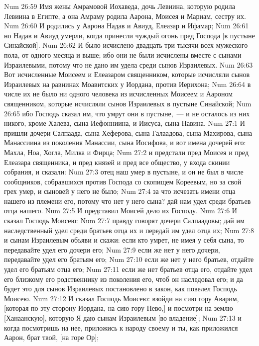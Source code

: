 \vs Num 26:59 Имя жены Амрамовой Иохаведа, дочь Левиина, которую родила  Левиина в Египте, а она Амраму родила Аарона, Моисея и Мариам, сестру их.
\vs Num 26:60 И родились у Аарона Надав и Авиуд, Елеазар и Ифамар;
\vs Num 26:61 но Надав и Авиуд умерли, когда принесли чуждый огонь пред Господа [в пустыне Синайской].
\vs Num 26:62 И было исчислено двадцать три тысячи всех мужеского пола, от одного месяца и выше; ибо они не были исчислены вместе с сынами Израилевыми, потому что не дано им удела среди сынов Израилевых.
\rsbpar\vs Num 26:63 Вот исчисленные Моисеем и Елеазаром священником, которые исчисляли сынов Израилевых на равнинах Моавитских у Иордана, против Иерихона;
\vs Num 26:64 в числе их не было ни одного человека из исчисленных Моисеем и Аароном священником, которые исчисляли сынов Израилевых в пустыне Синайской;
\vs Num 26:65 ибо Господь сказал им, что умрут они в пустыне,~--- и не осталось из них никого, кроме Халева, сына Иефонниина, и Иисуса, сына Навина.
\vs Num 27:1 И пришли дочери Салпаада, сына Хеферова, сына Галаадова, сына Махирова, сына Манассиина из поколения Манассии, сына Иосифова, и вот имена дочерей его: Махла, Ноа, Хогла, Милка и Фирца;
\vs Num 27:2 и предстали пред Моисея и пред Елеазара священника, и пред князей и пред все общество, у входа скинии собрания, и сказали:
\vs Num 27:3 отец наш умер в пустыне, и он не был в числе сообщников, собравшихся против Господа со скопищем Кореевым, но за свой грех умер, и сыновей у него не было;
\vs Num 27:4 за что исчезать имени отца нашего из племени его, потому что нет у него сына? дай нам удел среди братьев отца нашего.
\vs Num 27:5 И представил Моисей дело их Господу.
\rsbpar\vs Num 27:6 И сказал Господь Моисею:
\vs Num 27:7 правду говорят дочери Салпаадовы; дай им наследственный удел среди братьев отца их и передай им удел отца их;
\vs Num 27:8 и сынам Израилевым объяви и скажи: если кто умрет, не имея у себя сына, то передавайте удел его дочери его;
\vs Num 27:9 если же нет у него дочери, передавайте удел его братьям его;
\vs Num 27:10 если же нет у него братьев, отдайте удел его братьям отца его;
\vs Num 27:11 если же нет братьев отца его, отдайте удел его близкому его родственнику из поколения его, чтоб он наследовал его; и да будет это для сынов Израилевых постановлено в закон, как повелел Господь Моисею.
\rsbpar\vs Num 27:12 И сказал Господь Моисею: взойди на сию гору Аварим, [которая по эту сторону Иордана, на сию гору Нево,] и посмотри на землю [Ханаанскую], которую Я даю сынам Израилевым [во владение];
\vs Num 27:13 и когда посмотришь на нее, приложись к народу своему и ты, как приложился Аарон, брат твой, [на горе Ор];
